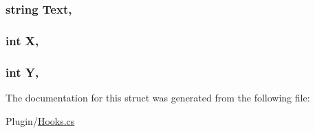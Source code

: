 \subsubsection[{Text}]{\setlength{\rightskip}{0pt plus 5cm}string Text\hspace{0.3cm}{\ttfamily [get]}, {\ttfamily [set]}}\label{structOTA_1_1Plugin_1_1HookArgs_1_1SignTextSet_ab4726c7c06ae41233e679361293b4173}
\hypertarget{structOTA_1_1Plugin_1_1HookArgs_1_1SignTextSet_a80c0944640e62d3ed6c5419c1bcc0c88}{}
\subsubsection[{X}]{\setlength{\rightskip}{0pt plus 5cm}int X\hspace{0.3cm}{\ttfamily [get]}, {\ttfamily [set]}}\label{structOTA_1_1Plugin_1_1HookArgs_1_1SignTextSet_a80c0944640e62d3ed6c5419c1bcc0c88}
\hypertarget{structOTA_1_1Plugin_1_1HookArgs_1_1SignTextSet_aa482c4cc86a24474e4fb19b5b5978778}{}
\subsubsection[{Y}]{\setlength{\rightskip}{0pt plus 5cm}int Y\hspace{0.3cm}{\ttfamily [get]}, {\ttfamily [set]}}\label{structOTA_1_1Plugin_1_1HookArgs_1_1SignTextSet_aa482c4cc86a24474e4fb19b5b5978778}


The documentation for this struct was generated from the following file\+:\begin{DoxyCompactItemize}
\item 
Plugin/\hyperlink{Hooks_8cs}{Hooks.\+cs}\end{DoxyCompactItemize}
